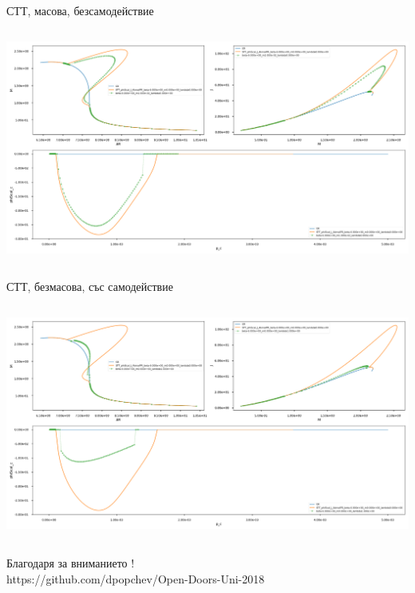 \documentclass[10pt,a4paper]{beamer}
\begin{document}
        \begin{frame}{ СТТ, масова, безсамодействие }
            \begin{columns}
                \begin{column}{\textwidth}
                    \includegraphics[width=\textwidth]{images/STT_beta-6_m1e-2_lambda0.png}
                \end{column}
            \end{columns}
        \end{frame}
    
        \begin{frame}{ СТТ, безмасова, със самодействие }
            \begin{columns}
                \begin{column}{\textwidth}
                    \includegraphics[width=\textwidth]{images/STT_beta-6_m0_lambda1.png}
                \end{column}
            \end{columns}
        \end{frame}
        
	\begin{frame}
		\begin{center} 
            {\Huge Благодаря за вниманието ! } \\[5mm]
            {\small https://github.com/dpopchev/Open-Doors-Uni-2018 }
        \end{center}
	\end{frame}
	
\end{document}
